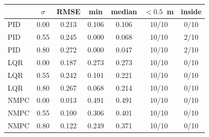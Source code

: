 \begin{tabular}{lcccccc}
\toprule
 & $\sigma$ & RMSE & min & median & $<0.5$~m & inside \\
\midrule
PID & 0.00 & 0.213 & 0.106 & 0.106 & 10/10 & 0/10 \\
PID & 0.55 & 0.245 & 0.000 & 0.068 & 10/10 & 2/10 \\
PID & 0.80 & 0.272 & 0.000 & 0.047 & 10/10 & 2/10 \\
LQR & 0.00 & 0.187 & 0.273 & 0.273 & 10/10 & 0/10 \\
LQR & 0.55 & 0.242 & 0.101 & 0.221 & 10/10 & 0/10 \\
LQR & 0.80 & 0.267 & 0.068 & 0.214 & 10/10 & 0/10 \\
NMPC & 0.00 & 0.013 & 0.491 & 0.491 & 10/10 & 0/10 \\
NMPC & 0.55 & 0.100 & 0.306 & 0.401 & 10/10 & 0/10 \\
NMPC & 0.80 & 0.122 & 0.249 & 0.371 & 10/10 & 0/10 \\
\bottomrule
\end{tabular}
